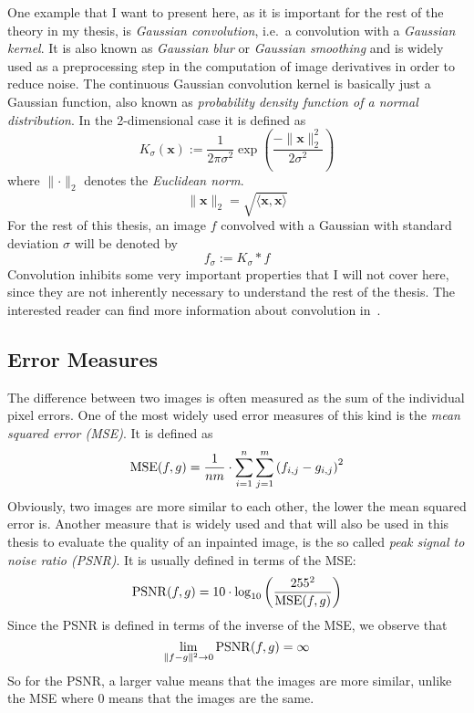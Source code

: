 One example that I want to present here, as it is important for the rest of the theory in my
thesis, is \textit{Gaussian convolution}, i.e.\ a convolution with a
\textit{Gaussian kernel}. It is also known as \textit{Gaussian blur} or \textit{Gaussian
smoothing} and is widely used as a preprocessing step in the computation of image derivatives in
order to reduce noise.
The continuous Gaussian convolution kernel is basically just a Gaussian function, also known as
\textit{probability density function of a normal distribution}. In the 2-dimensional case it is defined as
\begin{equation}
    K_\sigma (\boldsymbol x) := \frac{1}{2\pi\sigma^2}\exp\left(\frac{-\lVert\boldsymbol
            x\rVert_2^2}{2\sigma^2}\right)
\end{equation}
where $\lVert \cdot \rVert_2$ denotes the \textit{Euclidean norm}.
\begin{equation}
    \lVert \mathbf{x} \lVert_2 = \sqrt{\langle \mathbf{x}, \mathbf{x} \rangle}
\end{equation}
For the rest of this thesis, an image $f$ convolved with a Gaussian with standard deviation $\sigma$
will be denoted by \[f_\sigma := K_\sigma * f\]
Convolution inhibits some very important properties that I will not cover here, since they are not
inherently necessary to understand the rest of the thesis. The interested reader can find more
information about convolution in~\cite{dspguide, ipcv}.

\subsection{Error Measures}\label{sec:ErrorMeasure}

The difference between two images is often measured as the sum of the individual pixel errors. 
One of the most widely used error measures of this kind is the \textit{mean squared error (MSE)}. It is
defined as 
\begin{equation}
    \operatorname{MSE}(f, g) = \frac{1}{nm}\cdot\sum_{i=1}^{n}\sum_{j=1}^{m} {(f_{i,j} - g_{i,j})}^2
\end{equation}
Obviously, two images are more similar to each other, the lower the mean squared error is.
Another measure that is widely used and that will also be used in this thesis to evaluate the
quality of an inpainted image, is the so called \textit{peak signal to noise ratio (PSNR)}. 
It is usually defined in terms of the MSE\@:
\begin{equation}
    \operatorname{PSNR}(f, g) = 10 \cdot \log_{10}\left({\frac{255^2}{\operatorname{MSE}(f, g)}}\right)
\end{equation}
Since the PSNR is defined in terms of the inverse of the MSE, we observe that
\begin{equation}
    \lim_{\lVert f-g \rVert^2\to 0}\operatorname{PSNR}(f, g) = \infty
\end{equation}
So for the PSNR, a larger value means that the images are more similar, unlike the MSE where 0 
means that the images are the same. 

